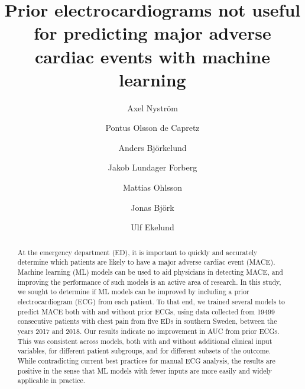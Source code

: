\documentclass[preprint]{elsarticle}
\begin{document}
\begin{frontmatter}

\title{Prior electrocardiograms not useful for predicting major adverse cardiac events with machine learning}


\author[inst1]{Axel Nystr\"{o}m}
\author[inst2,inst3]{Pontus Olsson de Capretz}
\author[inst4]{Anders Bj\"{o}rkelund}
\author[inst3,inst5]{Jakob Lundager Forberg}
\author[inst4,inst6]{Mattias Ohlsson}
\author[inst1,inst7]{Jonas Bj\"{o}rk}
\author[inst2,inst3]{Ulf Ekelund}


            






\begin{abstract}
At the emergency department (ED), it is important to quickly and accurately determine which patients are likely to have a major adverse cardiac event (MACE). Machine learning (ML) models can be used to aid physicians in detecting MACE, and improving the performance of such models is an active area of research. In this study, we sought to determine if ML models can be improved by including a prior electrocardiogram (ECG) from each patient. To that end, we trained several models to predict MACE both with and without prior ECGs, using data collected from 19499 consecutive patients with chest pain from five EDs in southern Sweden, between the years 2017 and 2018. Our results indicate no improvement in AUC from prior ECGs. This was consistent across models, both with and without additional clinical input variables, for different patient subgroups, and for different subsets of the outcome. While contradicting current best practices for manual ECG analysis, the results are positive in the sense that ML models with fewer inputs  are more easily and widely applicable in practice.
\end{abstract}


\end{frontmatter}
\end{document}
